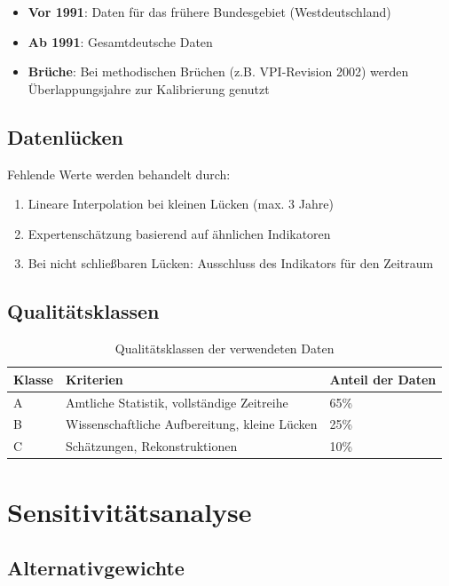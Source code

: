 \begin{itemize}
\item \textbf{Vor 1991}: Daten für das frühere Bundesgebiet (Westdeutschland)
\item \textbf{Ab 1991}: Gesamtdeutsche Daten
\item \textbf{Brüche}: Bei methodischen Brüchen (z.B. VPI-Revision 2002) werden Überlappungsjahre zur Kalibrierung genutzt
\end{itemize}

\subsection{Datenlücken}

Fehlende Werte werden behandelt durch:
\begin{enumerate}
\item Lineare Interpolation bei kleinen Lücken (max. 3 Jahre)
\item Expertenschätzung basierend auf ähnlichen Indikatoren
\item Bei nicht schließbaren Lücken: Ausschluss des Indikators für den Zeitraum
\end{enumerate}

\subsection{Qualitätsklassen}

\begin{table}[h]
\centering
\begin{tabular}{lll}
\toprule
\textbf{Klasse} & \textbf{Kriterien} & \textbf{Anteil der Daten} \\
\midrule
A & Amtliche Statistik, vollständige Zeitreihe & 65\% \\
B & Wissenschaftliche Aufbereitung, kleine Lücken & 25\% \\
C & Schätzungen, Rekonstruktionen & 10\% \\
\bottomrule
\end{tabular}
\caption{Qualitätsklassen der verwendeten Daten}
\label{tab:qualitaetsklassen}
\end{table}

\section{Sensitivitätsanalyse}

\subsection{Alternativgewichte}


